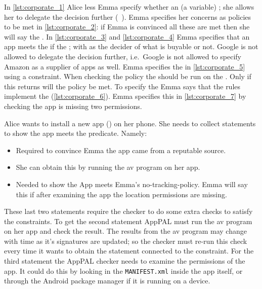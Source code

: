 \documentclass[]{llncs}
\begin{document}
In \autoref{lst:corporate_1} Alice less Emma  specify whether an  (a variable) ;
she allows her to delegate the decision further (\/~).
Emma specifies her concerns as policies to be met in \autoref{lst:corporate_2}:
  if Emma is convinced all these are met then she will say the .
In \autoref{lst:corporate_3} and \autoref{lst:corporate_4} Emma specifies that an app meets the  if the ;
  with  as the decider of what is buyable or not.
Google is not allowed to delegate the decision further, i.e.~Google is not allowed to specify Amazon as a supplier of apps as well.
Emma specifies the  in \autoref{lst:corporate_5} using a constraint.
When checking the policy the  should be run on the .
Only if this returns  will the policy be met.
To specify the  Emma says that the  rules implement the  (\autoref{lst:corporate_6}).
Emma specifies this in \autoref{lst:corporate_7} by checking the app is missing two permissions.

Alice wants to install a new app () on her phone.
She needs to collect statements to show the app meets the  predicate.
Namely:
\begin{itemize}
  \item{}
    Required to convince Emma the app came from a reputable source.
  \item{}
    She can obtain this by running the \ac{av} program on her app.
  \item{}
    Needed to show the App meets Emma's no-tracking-policy.
    Emma will say this if after examining the app the location permissions are missing.
\end{itemize}
These last two statements require the checker to do some extra checks to satisfy the constraints.
To get the second statement AppPAL must run the \ac{av} program on her app and check the result.
The results from the \ac{av} program may change with time as it's signatures are updated;
  so the checker must re-run this check every time it wants to obtain the statement connected to the constraint.
For the third statement the AppPAL checker needs to examine the permissions of the app.
It could do this by looking in the \texttt{MANIFEST.xml} inside the app itself, or through the Android package manager if it is running on a device.
\end{document}
